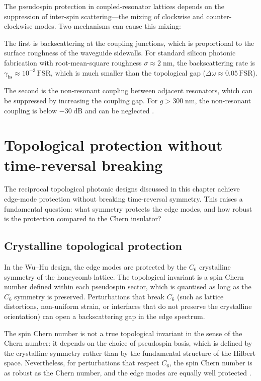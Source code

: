 The pseudospin protection in coupled-resonator lattices depends on the
suppression of inter-spin scattering---the mixing of clockwise and
counter-clockwise modes.  Two mechanisms can cause this mixing:

The first is backscattering at the coupling junctions, which is
proportional to the surface roughness of the waveguide sidewalls.
For standard silicon photonic fabrication with root-mean-square
roughness $\sigma\approx 2\;\mathrm{nm}$, the backscattering rate is
$\gamma_{\mathrm{bs}}\approx 10^{-3}\,\mathrm{FSR}$, which is much
smaller than the topological gap ($\Delta\omega\approx 0.05\,\mathrm{FSR}$).

The second is the non-resonant coupling between adjacent resonators,
which can be suppressed by increasing the coupling gap.  For
$g>300\;\mathrm{nm}$, the non-resonant coupling is below $-30\;\mathrm{dB}$
and can be neglected \cite{ozawa2018topological,price2022roadmap}.

\section{Topological protection without time-reversal breaking}
\label{sec:ch11-protection-theory}

The reciprocal topological photonic designs discussed in this chapter
achieve edge-mode protection without breaking time-reversal symmetry.
This raises a fundamental question: what symmetry protects the edge
modes, and how robust is the protection compared to the Chern
insulator?

\subsection{Crystalline topological protection}
\label{sec:ch11-crystalline}

In the Wu--Hu design, the edge modes are protected by the $C_6$
crystalline symmetry of the honeycomb lattice.  The topological
invariant is a spin Chern number defined within each pseudospin
sector, which is quantised as long as the $C_6$ symmetry is
preserved.  Perturbations that break $C_6$ (such as lattice
distortions, non-uniform strain, or interfaces that do not preserve
the crystalline orientation) can open a backscattering gap in the
edge spectrum.

The spin Chern number is not a true topological invariant in the
sense of the Chern number: it depends on the choice of pseudospin
basis, which is defined by the crystalline symmetry rather than by
the fundamental structure of the Hilbert space.  Nevertheless, for
perturbations that respect $C_6$, the spin Chern number is as robust
as the Chern number, and the edge modes are equally well protected
\cite{ozawa2018topological,mario2016microsoft}.


